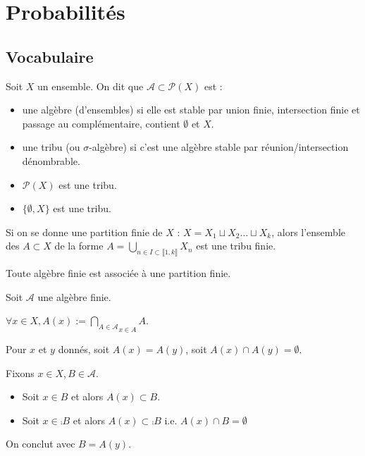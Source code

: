 \documentclass[10pt,a4paper,notitlepage ]{report}
\begin{document}
\chapter{Probabilités}
\section{Vocabulaire}

\begin{definition}
	Soit $X$ un ensemble. On dit que $\mathcal A \subset \mathcal P(X)$ est :
	\begin{itemize}
		\item une algèbre (d'ensembles) si elle est stable par union finie, intersection finie et passage au complémentaire, contient $\emptyset$ et $X$.
		\item une tribu (ou $\sigma$-algèbre) si c'est une algèbre stable par réunion/intersection dénombrable.
	\end{itemize}
\end{definition}

\begin{exemple}
	\begin{itemize}
		\item $\mathcal P(X)$ est une tribu.
		\item $\{\emptyset, X\}$ est une tribu.
	\end{itemize}
\end{exemple}

Si on se donne une partition finie de $X$ : $X=X_1 \sqcup X_2 \dots \sqcup X_k$, alors l'ensemble des $A \subset X$ de la forme $A=\underset{n\in I \subset \llbracket 1,k \rrbracket}{\bigcup}X_n$ est une tribu finie.

\begin{lemme}
	Toute algèbre finie est associée à une partition finie.
\end{lemme}

\begin{demo}
	Soit $\mathcal A$ une algèbre finie.
	
	$\forall x \in X, A(x) := \underset{x\in A}{\underset{A\in \mathcal A}{\bigcap}} A$.
	
	Pour $x$ et $y$ donnés, soit $A(x) = A(y)$, soit $A(x) \cap A(y) = \emptyset$.
	
	Fixons $x\in X, B\in\mathcal A$.
	\begin{itemize}
		\item Soit $x\in B$ et alors $A(x)\subset B$.
		\item Soit $x\in \comp B$ et alors $A(x)\subset \comp B$ i.e. $A(x)\cap B = \emptyset$
	\end{itemize}
	On conclut avec $B=A(y)$.
\end{demo}
\end{document}
